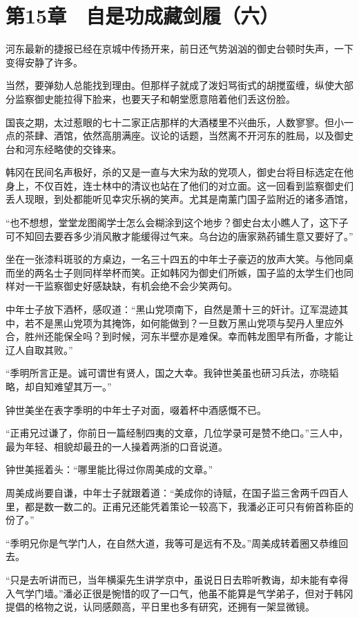 \section{第15章　自是功成藏剑履（六）}

河东最新的捷报已经在京城中传扬开来，前日还气势汹汹的御史台顿时失声，一下变得安静了许多。

当然，要弹劾人总能找到理由。但那样子就成了泼妇骂街式的胡搅蛮缠，纵使大部分监察御史能拉得下脸来，也要天子和朝堂愿意陪着他们丢这份脸。

国丧之期，太过惹眼的七十二家正店那样的大酒楼里不兴曲乐，人数寥寥。但小一点的茶肆、酒馆，依然高朋满座。议论的话题，当然离不开河东的胜局，以及御史台和河东经略使的交锋来。

韩冈在民间名声极好，杀的又是一直与大宋为敌的党项人，御史台将目标选定在他身上，不仅百姓，连士林中的清议也站在了他们的对立面。这一回看到监察御史们丢人现眼，到处都能听见幸灾乐祸的笑声。尤其是南薰门国子监附近的诸多酒馆，

“也不想想，堂堂龙图阁学士怎么会糊涂到这个地步？御史台太小瞧人了，这下子可不知回去要吞多少消风散才能缓得过气来。乌台边的唐家熟药铺生意又要好了。”

坐在一张漆料斑驳的方桌边，一名三十四五的中年士子豪迈的放声大笑。与他同桌而坐的两名士子则同样举杯而笑。正如韩冈为御史们所嫉，国子监的太学生们也同样对一干监察御史好感缺缺，有机会绝不会少笑两句。

中年士子放下酒杯，感叹道：“黑山党项南下，自然是萧十三的奸计。辽军混迹其中，若不是黑山党项为其掩饰，如何能做到？一旦数万黑山党项与契丹人里应外合，胜州还能保全吗？到时候，河东半壁亦是难保。幸而韩龙图早有所备，才能让辽人自取其败。”

“季明所言正是。诚可谓世有贤人，国之大幸。我钟世美虽也研习兵法，亦晓韬略，却自知难望其万一。”

钟世美坐在表字季明的中年士子对面，啜着杯中酒感慨不已。

“正甫兄过谦了，你前日一篇经制四夷的文章，几位学录可是赞不绝口。”三人中，最为年轻、相貌却最丑的一人操着两浙的口音说道。

钟世美摇着头：“哪里能比得过你周美成的文章。”

周美成尚要自谦，中年士子就跟着道：“美成你的诗赋，在国子监三舍两千四百人里，都是数一数二的。正甫兄还能凭着策论一较高下，我潘必正可只有俯首称臣的份了。”

“季明兄你是气学门人，在自然大道，我等可是远有不及。”周美成转着圈又恭维回去。

“只是去听讲而已，当年横渠先生讲学京中，虽说日日去聆听教诲，却未能有幸得入气学门墙。”潘必正很是惋惜的叹了一口气，他虽不能算是气学弟子，但对于韩冈提倡的格物之说，认同感颇高，平日里也多有研究，还拥有一架显微镜。

